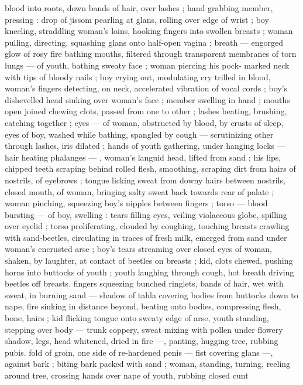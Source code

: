 blood into roots, down bands of hair, over lashes ; hand grabbing 
member, pressing : drop of jissom pearling at glans, rolling over 
edge of wrist ; boy kneeling, straddling woman's loins, hooking 
fingers into swollen breasts ; woman pulling, directing, squashing 
glans onto half-open vagina ; breath --- engorged glow of rosy fire 
bathing mouths, filtered through transparent membranes of torn 
lungs --- of youth, bathing sweaty face ; woman piercing his pock- 
marked neck with tips of bloody nails ; boy crying out, modulating 
cry trilled in blood, woman's fingers detecting, on neck, accelerated 
vibration of vocal cords ; boy's dishevelled head sinking over 
woman's face ; member swelling in hand ; mouths open joined 
chewing clots, passed from one to other ; lashes beating, brushing, 
catching together ; eyes --- of woman, obstructed by blood, by 
crusts of sleep, eyes of boy, washed while bathing, spangled by 
cough --- scrutinizing other through lashes, iris dilated ; hands of 
youth gathering, under hanging locks --- hair heating phalanges --- 
, woman's languid head, lifted from sand ; his lips, chipped teeth 
scraping behind rolled flesh, smoothing, scraping dirt from hairs of 
nostrils, of eyebrows ; tongue licking sweat from downy hairs 
between nostrils, closed mouth, of woman, bringing salty sweat back 
towards rear of palate ; woman pinching, squeezing boy's nipples 
between fingers ; torso --- blood bursting --- of boy, swelling : tears 
filling eyes, veiling violaceous globe, spilling over eyelid ; torso 
proliferating, clouded by coughing, touching breasts crawling with 
sand-beetles, circulating in traces of fresh milk, emerged from sand 
under woman's encrusted arse ; boy's tears streaming over closed 
eyes of woman, shaken, by laughter, at contact of beetles on breasts 
; kid, clots chewed, pushing horns into buttocks of youth ; youth 
laughing through cough, hot breath driving beetles off breasts. 
fingers squeezing bunched ringlets, bands of hair, wet with sweat, in 
burning sand --- shadow of tahla covering bodies from buttocks 
down to nape, fire sinking in distance beyond, beating onto bodies, 
compressing flesh, bone, hairs ; kid flicking tongue onto sweaty edge 
of arse, youth standing, stepping over body --- trunk coppery, sweat 
mixing with pollen under flowery shadow, legs, head whitened, dried 
in fire ---, panting, hugging tree, rubbing pubis. fold of groin, one 
side of re-hardened penis --- fist covering glans ---, against bark ; 
biting bark packed with sand ; woman, standing, turning, reeling 
around tree, crossing hands over nape of youth, rubbing closed cunt 
